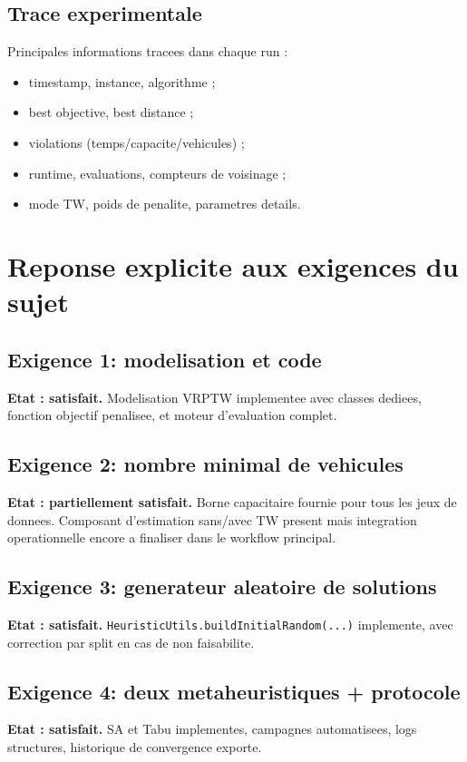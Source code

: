 \documentclass[12pt,a4paper]{report}
\begin{document}
\section{Trace experimentale}
Principales informations tracees dans chaque run :
\begin{itemize}[leftmargin=1.2cm]
  \item timestamp, instance, algorithme ;
  \item best objective, best distance ;
  \item violations (temps/capacite/vehicules) ;
  \item runtime, evaluations, compteurs de voisinage ;
  \item mode TW, poids de penalite, parametres details.
\end{itemize}

\chapter{Reponse explicite aux exigences du sujet}

\section{Exigence 1: modelisation et code}
\textbf{Etat : satisfait.}
Modelisation VRPTW implementee avec classes dediees,
fonction objectif penalisee, et moteur d'evaluation complet.

\section{Exigence 2: nombre minimal de vehicules}
\textbf{Etat : partiellement satisfait.}
Borne capacitaire fournie pour tous les jeux de donnees.
Composant d'estimation sans/avec TW present mais integration operationnelle
encore a finaliser dans le workflow principal.

\section{Exigence 3: generateur aleatoire de solutions}
\textbf{Etat : satisfait.}
\texttt{HeuristicUtils.buildInitialRandom(...)} implemente,
avec correction par split en cas de non faisabilite.

\section{Exigence 4: deux metaheuristiques + protocole}
\textbf{Etat : satisfait.}
SA et Tabu implementes, campagnes automatisees, logs structures, historique de convergence exporte.
\end{document}
